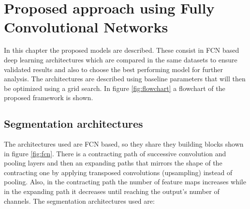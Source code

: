 \chapter{Proposed approach using Fully Convolutional Networks}

In this chapter the proposed models are described. These consist in FCN based deep learning architectures which are compared in the same datasets to ensure validated results and also to choose the best performing model for further analysis. The architectures are described using baseline parameters that will then be optimized using a grid search. In figure \ref{fig:flowchart} a flowchart of the proposed framework is shown.

\section{Segmentation architectures}
The architectures used are FCN based, so they share they building blocks shown in figure \ref{fig:fcn}. There is a contracting path of successive convolution and pooling layers and then an expanding paths that mirrors the shape of the contracting one by applying transposed convolutions (upsampling) instead of pooling. Also, in the contracting path the number of feature maps increases while in the expanding path it decreases until reaching the output's number of channels. The segmentation architectures used are:

